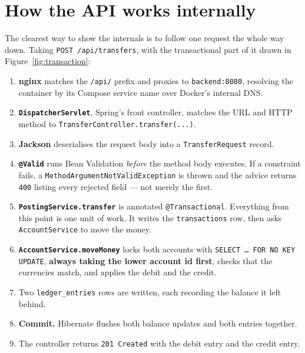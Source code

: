 \documentclass[11pt,a4paper]{article}
\begin{document}
\section{How the API works internally}

The clearest way to show the internals is to follow one request the whole way down. Taking
\texttt{POST /api/transfers}, with the transactional part of it drawn in
Figure~\ref{fig:transaction}:

\begin{enumerate}[leftmargin=*, itemsep=3pt]
  \item \textbf{nginx} matches the \texttt{/api/} prefix and proxies to \texttt{backend:8080},
        resolving the container by its Compose service name over Docker's internal DNS.
  \item \textbf{\texttt{DispatcherServlet}}, Spring's front controller, matches the URL and HTTP
        method to \texttt{TransferController.transfer(...)}.
  \item \textbf{Jackson} deserialises the request body into a \texttt{TransferRequest} record.
  \item \textbf{\texttt{@Valid}} runs Bean Validation \emph{before} the method body executes. If a
        constraint fails, a \texttt{MethodArgumentNotValidException} is thrown and the advice
        returns \texttt{400} listing every rejected field --- not merely the first.
  \item \textbf{\texttt{PostingService.transfer}} is annotated \texttt{@Transactional}. Everything
        from this point is one unit of work. It writes the \texttt{transactions} row, then asks
        \texttt{AccountService} to move the money.
  \item \textbf{\texttt{AccountService.moveMoney}} locks both accounts with
        \texttt{SELECT \ldots\ FOR NO KEY UPDATE}, \textbf{always taking the lower account id
        first}, checks that the currencies match, and applies the debit and the credit.
  \item Two \texttt{ledger\_entries} rows are written, each recording the balance it left behind.
  \item \textbf{Commit.} Hibernate flushes both balance updates and both entries together.
  \item The controller returns \texttt{201 Created} with the debit entry and the credit entry.
\end{enumerate}
\end{document}
